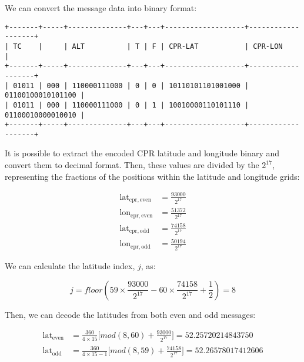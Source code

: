 We can convert the message data into binary format:

\begin{verbatim}
+-------+-----+--------------+---+---+-------------------+-------------------+
| TC    |     | ALT          | T | F | CPR-LAT           | CPR-LON           |
+-------+-----+--------------+---+---+-------------------+-------------------+
| 01011 | 000 | 110000111000 | 0 | 0 | 10110101101001000 | 01100100010101100 |
| 01011 | 000 | 110000111000 | 0 | 1 | 10010000110101110 | 01100010000010010 |
+-------+-----+--------------+---+---+-------------------+-------------------+
\end{verbatim}

It is possible to extract the encoded CPR latitude and longitude binary and convert them to decimal format. Then, these values are divided by the $2^{17}$, representing the fractions of the positions within the latitude and longitude grids:

\begin{equation}
  \begin{split}
    \mathrm{lat}_\mathrm{cpr,even} &= \frac{93000}{2^{17}} \\
    \mathrm{lon}_\mathrm{cpr,even} &= \frac{51372}{2^{17}} \\
    \mathrm{lat}_\mathrm{cpr,odd} &=  \frac{74158}{2^{17}} \\
    \mathrm{lon}_\mathrm{cpr,odd} &=  \frac{50194}{2^{17}}
  \end{split}
\end{equation}

We can calculate the latitude index, $j$, as:

\begin{equation}
  j = floor \left( 59 \times \frac{93000}{2^{17}} - 60 \times \frac{74158}{2^{17}} + \frac{1}{2}  \right) = 8
\end{equation}

Then, we can decode the latitudes from both even and odd messages:

\begin{equation}
  \begin{split}
    \mathrm{lat}_\mathrm{even} &= \frac{360}{4 \times 15} \Big[ mod(8, 60) + \frac{93000}{2^{17}} \Big] = 52.25720214843750 \\
    \mathrm{lat}_\mathrm{odd} &= \frac{360}{4 \times 15 - 1} \Big[ mod(8, 59) + \frac{74158}{2^{17}} \Big] = 52.26578017412606
  \end{split}
\end{equation}

